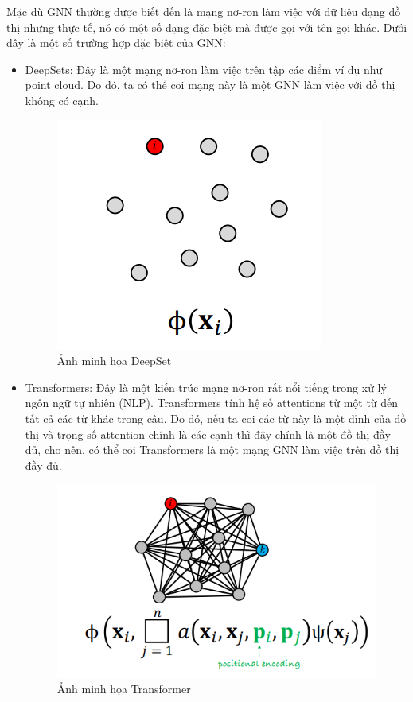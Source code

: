 Mặc dù GNN thường được biết đến là mạng nơ-ron làm việc với dữ liệu dạng đồ thị nhưng thực tế, nó có một số dạng đặc biệt mà được gọi với tên gọi khác. Dưới đây là một số trường hợp đặc biệt của GNN:

\begin{itemize}
    \item DeepSets\cite{zaheer2018deepsets}: Đây là một mạng nơ-ron làm việc trên tập các điểm ví dụ như point cloud. Do đó, ta có thể coi mạng này là một GNN làm việc với đồ thị không có cạnh.

    \begin{figure}[H]
    \centering
    \captionsetup{justification=centering}
    \includegraphics[width=0.4\linewidth]{Images/GDL/graph/deepset.png}
    \caption{Ảnh minh họa DeepSet\cite{geometricdeep2022}}
\end{figure}

    \item Transformers\cite{vaswani2023attentionneed}: Đây là một kiến trúc mạng nơ-ron rất nổi tiếng trong xử lý ngôn ngữ tự nhiên (NLP). Transformers tính hệ số attentions từ một từ đến tất cả các từ khác trong câu. Do đó, nếu ta coi các từ này là một đỉnh của đồ thị và trọng số attention chính là các cạnh thì đây chính là một đồ thị đầy đủ, cho nên, có thể coi Transformers là một mạng GNN làm việc trên đồ thị đầy đủ.

    \begin{figure}[H]
    \centering
    \captionsetup{justification=centering}
    \includegraphics[width=0.7\linewidth]{Images/GDL/graph/transformer.png}
    \caption{Ảnh minh họa Transformer\cite{geometricdeep2022}}
\end{figure}

\end{itemize}

